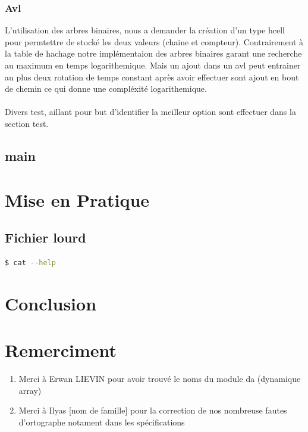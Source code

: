 \documentclass[12pt]{article}
\begin{document}
    \subsubsection{Avl}

    L'utilisation des arbres binaires, nous a demander la création d'un type hcell pour permtettre de stocké les deux valeurs (chaine et compteur). Contrairement à la table de hachage notre implémentaion des arbres binaires garant une recherche au maximum en temps logarithemique. Mais un ajout dans un avl peut entrainer au plus deux rotation de temps constant après avoir effectuer sont ajout en bout de chemin ce qui donne une compléxité logarithemique.\\ \\
    
    Divers test, aillant pour but d'identifier la meilleur option sont effectuer dans la section test.

    \subsection{main} \label{main}
       
    

    \newpage

    \section{Mise en Pratique}

        \subsection{Fichier lourd}

            \begin{lstlisting}[language=bash]
              $ cat --help
            \end{lstlisting}

    \newpage
    
    \section{Conclusion}
    
    \section{Remerciment}

    \begin{enumerate}
        \item[] Merci à Erwan LIEVIN pour avoir trouvé le noms du module da (dynamique array)
        \item[] Merci à Ilyas [nom de famille] pour la correction de nos nombreuse fautes d'ortographe notament dans les spécifications
    \end{enumerate}

    
\end{document}
